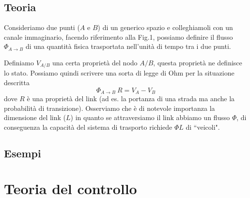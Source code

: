 \documentclass[12pt, a4paper]{book}
\theoremstyle{theorem}
\begin{document}
		\section{Teoria}
			Consideriamo due punti ($A$ e $B$) di un generico spazio e colleghiamoli con un canale immaginario, facendo riferimento alla Fig.1, possiamo definire il flusso $\Phi_{A \rightarrow B}$ di una quantità fisica trasportata nell'unità di tempo tra i due punti.
			\begin{figure}[ht!]
					\centering
					\caption{}
			\end{figure}
			Definiamo $V_{A/B}$ una certa proprietà del nodo $A/B$, questa proprietà ne definisce lo stato. Possiamo quindi scrivere una sorta di legge di Ohm per la situazione descritta 
			\begin{equation*}
					\Phi_{A \rightarrow B} \ R = V_A - V_B
			\end{equation*} dove $R$ è una proprietà del link (ad es. la portanza di una strada ma anche la probabilità di transizione).
			Osserviamo che è di notevole importanza la dimensione del link ($L$) in quanto se attraversiamo il link abbiamo un flusso $\Phi$, di conseguenza la capacità del sistema di trasporto richiede $\Phi L$ di “veicoli".			
			\begin{figure}[ht!]
					\centering
					\caption{}
			\end{figure}
		
		\section{Esempi}

		
	
	
	\chapter{Teoria del controllo} %
\end{document}
